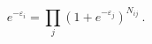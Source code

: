 \begin{equation}
e^{-\varepsilon _{i}}=\prod\limits_{j}(1+e^{-\varepsilon _{j}})^{N_{ij}}~.
\label{ctba}
\end{equation}%
